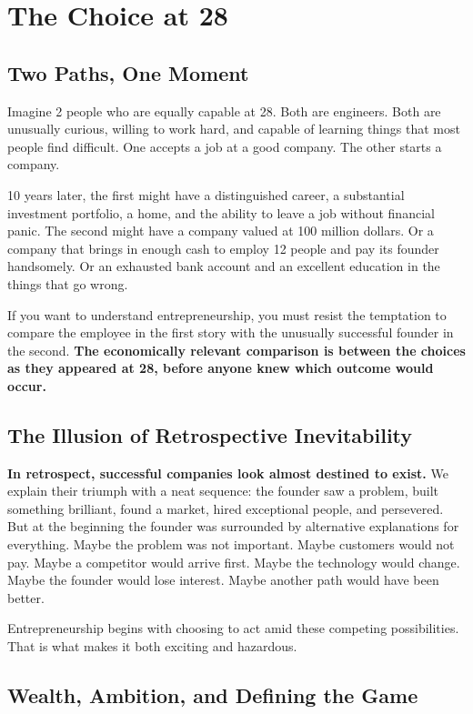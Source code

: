 \section{The Choice at 28}

\subsection{Two Paths, One Moment}

Imagine 2 people who are equally capable at 28. Both are engineers. Both are unusually curious, willing to work hard, and capable of learning things that most people find difficult. One accepts a job at a good company. The other starts a company.

10 years later, the first might have a distinguished career, a substantial investment portfolio, a home, and the ability to leave a job without financial panic. The second might have a company valued at 100 million dollars. Or a company that brings in enough cash to employ 12 people and pay its founder handsomely. Or an exhausted bank account and an excellent education in the things that go wrong.

If you want to understand entrepreneurship, you must resist the temptation to compare the employee in the first story with the unusually successful founder in the second. \textbf{The economically relevant comparison is between the choices as they appeared at 28, before anyone knew which outcome would occur.}

\subsection{The Illusion of Retrospective Inevitability}

\textbf{In retrospect, successful companies look almost destined to exist.} We explain their triumph with a neat sequence: the founder saw a problem, built something brilliant, found a market, hired exceptional people, and persevered. But at the beginning the founder was surrounded by alternative explanations for everything. Maybe the problem was not important. Maybe customers would not pay. Maybe a competitor would arrive first. Maybe the technology would change. Maybe the founder would lose interest. Maybe another path would have been better.

Entrepreneurship begins with choosing to act amid these competing possibilities. That is what makes it both exciting and hazardous.

\subsection{Wealth, Ambition, and Defining the Game}

